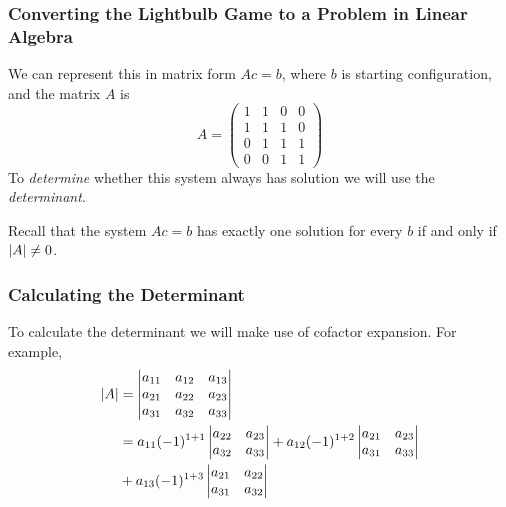\documentclass{beamer}
\DeclarePairedDelimiter\abs{\lvert}{\rvert}%
\begin{document}
\begin{frame}
\frametitle{Converting the Lightbulb Game to a Problem in Linear Algebra}

We can represent this in matrix form $Ac=b$, where $b$ is starting configuration, and
the matrix $A$ is
\[
    A=
    \begin{pmatrix}
        1 & 1 & 0 & 0\\
        1 & 1 & 1 & 0\\
        0 & 1 & 1 & 1\\
        0 & 0 & 1 & 1
    \end{pmatrix}
\]
\pause 
To \emph{determine} whether this system always has solution we will use the
\emph{determinant}.
\pause

Recall that the system $Ac=b$ has exactly one solution for every $b$ if and only if
$\abs{A} \neq 0$.
\end{frame}

\begin{frame}
    \frametitle{Calculating the Determinant}

    To calculate the determinant we will make use of cofactor expansion. For example,
    \begin{align*}
        \abs{A} &=
        \begin{vmatrix}
            a_{11} & a_{12} & a_{13}\\
            a_{21} & a_{22} & a_{23}\\
            a_{31} & a_{32} & a_{33}
        \end{vmatrix}\\
        &= a_{11}(-1)^{1+1}
        \begin{vmatrix}
            a_{22} & a_{23} \\
            a_{32} & a_{33}
        \end{vmatrix}
        +
        a_{12}(-1)^{1+2}
        \begin{vmatrix}
            a_{21} & a_{23} \\
            a_{31} & a_{33}
        \end{vmatrix}\\
        &+ a_{13}(-1)^{1+3}
        \begin{vmatrix}
            a_{21} & a_{22} \\
            a_{31} & a_{32}
        \end{vmatrix}
    \end{align*}
\end{frame}
\end{document}
